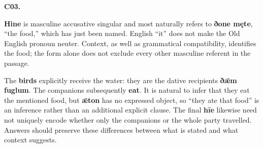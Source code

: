 \par\begin{minipage}{\linewidth}\raggedright
\textbf{C03.}

\textbf{Hine} is masculine accusative singular and most naturally refers to \textbf{ðone męte}, “the food,” which has just been named. English “it” does not make the Old English pronoun neuter. Context, as well as grammatical compatibility, identifies the food; the form alone does not exclude every other masculine referent in the passage.

The \textbf{birds} explicitly receive the water: they are the dative recipients \textbf{ðǣm fuglum}. The companions subsequently \textbf{eat}. It is natural to infer that they eat the mentioned food, but \textbf{ǣton} has no expressed object, so “they ate that food” is an inference rather than an additional explicit clause. The final \textbf{hīe} likewise need not uniquely encode whether only the companions or the whole party travelled. Answers should preserve these differences between what is stated and what context suggests.

\end{minipage}\par\addvspace{4pt}

